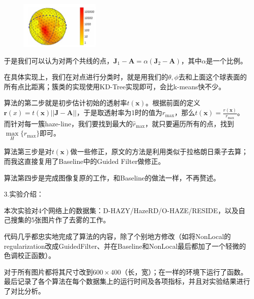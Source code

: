 \documentclass[12pt]{article}
\begin{document}
\begin{figure}[h]
    \centering
    \includegraphics[width = 0.35\textwidth]{dip3.jpg}
\end{figure}\par
于是我们可以认为对两个共线的点，$\bm{J}_1 - \bm{A} = \alpha(\bm{J}_2-\bm{A})$，其中$\alpha$是一个比例。\par
在具体实现上，我们在对点进行分类时，就是用我们的$\theta,\phi$去和上面这个球表面的所有点比距离；簇类的实现使用KD-Tree实现即可，会比k-means快不少。\par
算法的第二步就是初步估计初始的透射率$t(\bm{x})$。根据前面的定义$\bm{r}(x)=t(\bm{x})\left\vert|\bm{J}-\bm{A}|\right\vert$，于是取透射率为1时的值为$r_{\max}$，那么$\displaystyle t(\bm{x})=\frac{r(\bm{x})}{r_{\max}}$。而针对每一簇haze-line，我们要找到最大的$\hat{r}_{\max}$，就只要遍历所有的点，找到$\displaystyle\max\limits_H\{r_{\max}\}$即可。\par
算法第三步是对$t(\bm{x})$做一些修正，原文的方法是利用类似于拉格朗日乘子去算；而我这直接复用了Baseline中的Guided Filter做修正。\par
算法第四步是完成图像复原的工作，和Baseline的做法一样，不再赘述。\\
\newpage
\begin{Large}
\noindent 3.实验介绍：\par
\end{Large}
本次实验对4个网络上的数据集：D-HAZY\cite{7532754}/HazeRD\cite{8296874}/O-HAZE\cite{O-HAZE_2018}/RESIDE\cite{li2019benchmarking}，以及自己搜集的5张图片作了去雾的工作。\par
代码几乎都忠实地完成了算法的内容，除了个别地方修改（如将NonLocal的regularization改成GuidedFilter、并在Baseline和NonLocal最后都加了一个轻微的色调校正函数）。\par
对于所有图片都将其尺寸改到$600 \times 400$（长，宽）；在一样的环境下运行了函数。最后记录了各个算法在每个数据集上的运行时间及各项指标，并且对实验结果进行了对比分析。\\
\end{document}
